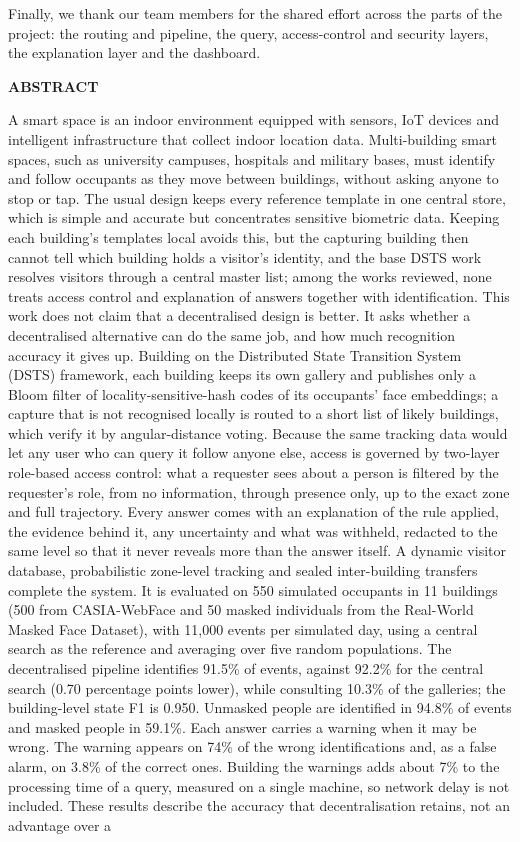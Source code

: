 \documentclass[12pt,a4paper,oneside]{report}
\begin{document}
Finally, we thank our team members for the shared effort across the parts of the project: the routing and pipeline, the query, access-control and security layers, the explanation layer and the dashboard.

\clearpage
{}
{}
{\centering \Large\bfseries ABSTRACT\par}
A smart space is an indoor environment equipped with sensors, IoT devices and intelligent infrastructure that collect indoor location data. Multi-building smart spaces, such as university campuses, hospitals and military bases, must identify and follow occupants as they move between buildings, without asking anyone to stop or tap. The usual design keeps every reference template in one central store, which is simple and accurate but concentrates sensitive biometric data. Keeping each building's templates local avoids this, but the capturing building then cannot tell which building holds a visitor's identity, and the base DSTS work resolves visitors through a central master list; among the works reviewed, none treats access control and explanation of answers together with identification. This work does not claim that a decentralised design is better. It asks whether a decentralised alternative can do the same job, and how much recognition accuracy it gives up. Building on the Distributed State Transition System (DSTS) framework, each building keeps its own gallery and publishes only a Bloom filter of locality-sensitive-hash codes of its occupants' face embeddings; a capture that is not recognised locally is routed to a short list of likely buildings, which verify it by angular-distance voting. Because the same tracking data would let any user who can query it follow anyone else, access is governed by two-layer role-based access control: what a requester sees about a person is filtered by the requester's role, from no information, through presence only, up to the exact zone and full trajectory. Every answer comes with an explanation of the rule applied, the evidence behind it, any uncertainty and what was withheld, redacted to the same level so that it never reveals more than the answer itself. A dynamic visitor database, probabilistic zone-level tracking and sealed inter-building transfers complete the system. It is evaluated on 550 simulated occupants in 11 buildings (500 from CASIA-WebFace and 50 masked individuals from the Real-World Masked Face Dataset), with 11,000 events per simulated day, using a central search as the reference and averaging over five random populations. The decentralised pipeline identifies 91.5\% of events, against 92.2\% for the central search (0.70 percentage points lower), while consulting 10.3\% of the galleries; the building-level state F1 is 0.950. Unmasked people are identified in 94.8\% of events and masked people in 59.1\%. Each answer carries a warning when it may be wrong. The warning appears on 74\% of the wrong identifications and, as a false alarm, on 3.8\% of the correct ones. Building the warnings adds about 7\% to the processing time of a query, measured on a single machine, so network delay is not included. These results describe the accuracy that decentralisation retains, not an advantage over a 
\end{document}
